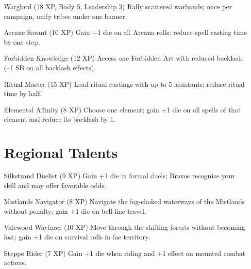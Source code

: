 \documentclass[11pt]{article}
\begin{document}
\begin{talentbox}{Warglord (18 XP, Body 5, Leadership 3)}
Rally scattered warbands; once per campaign, unify tribes under one banner.
\end{talentbox}

\begin{talentbox}{Arcane Savant (10 XP)}
Gain +1 die on all Arcana rolls; reduce spell casting time by one step.
\end{talentbox}

\begin{talentbox}{Forbidden Knowledge (12 XP)}
Access one Forbidden Art with reduced backlash (--1 SB on all backlash effects).
\end{talentbox}

\begin{talentbox}{Ritual Master (15 XP)}
Lead ritual castings with up to 5 assistants; reduce ritual time by half.
\end{talentbox}

\begin{talentbox}{Elemental Affinity (8 XP)}
Choose one element; gain +1 die on all spells of that element and reduce its backlash by 1.
\end{talentbox}

\section*{Regional Talents}

\begin{talentbox}{Silkstrand Duelist (9 XP)}
Gain +1 die in formal duels; Bravos recognize your skill and may offer favorable odds.
\end{talentbox}

\begin{talentbox}{Mistlands Navigator (8 XP)}
Navigate the fog-choked waterways of the Mistlands without penalty; gain +1 die on bell-line travel.
\end{talentbox}

\begin{talentbox}{Valewood Wayfarer (10 XP)}
Move through the shifting forests without becoming lost; gain +1 die on survival rolls in fae territory.
\end{talentbox}

\begin{talentbox}{Steppe Rider (7 XP)}
Gain +1 die when riding and +1 effect on mounted combat actions.
\end{talentbox}
\end{document}
